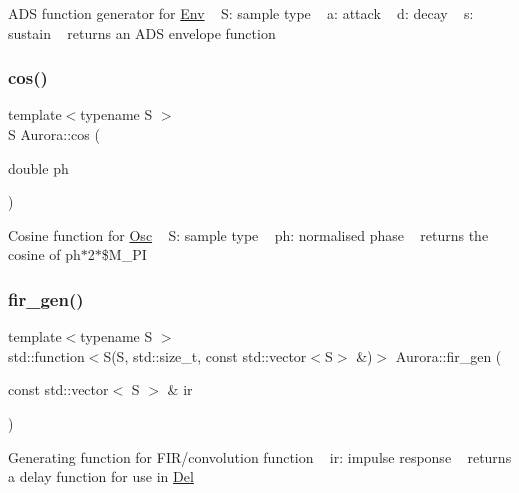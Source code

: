 A\+DS function generator for \hyperlink{class_aurora_1_1_env}{Env} ~\newline
S\+: sample type ~\newline
a\+: attack ~\newline
d\+: decay ~\newline
s\+: sustain ~\newline
returns an A\+DS envelope function \mbox{\label{namespace_aurora_ab6ef1b966b8f27d107fcabe1027a677a}} 
\subsubsection{\texorpdfstring{cos()}{cos()}}
{\footnotesize\ttfamily template$<$typename S $>$ \\
S Aurora\+::cos (\begin{DoxyParamCaption}\item[{double}]{ph }\end{DoxyParamCaption})}

Cosine function for \hyperlink{class_aurora_1_1_osc}{Osc} ~\newline
S\+: sample type ~\newline
ph\+: normalised phase ~\newline
returns the cosine of ph$\ast$2$\ast$\$\+M\+\_\+\+PI \mbox{\label{namespace_aurora_abf3b452f54db43f366b261c3702b0c0b}} 
\subsubsection{\texorpdfstring{fir\+\_\+gen()}{fir\_gen()}}
{\footnotesize\ttfamily template$<$typename S $>$ \\
std\+::function$<$S(S, std\+::size\+\_\+t, const std\+::vector$<$S$>$ \&)$>$ Aurora\+::fir\+\_\+gen (\begin{DoxyParamCaption}\item[{const std\+::vector$<$ S $>$ \&}]{ir }\end{DoxyParamCaption})}

Generating function for F\+I\+R/convolution function ~\newline
ir\+: impulse response ~\newline
returns a delay function for use in \hyperlink{class_aurora_1_1_del}{Del} \mbox{\label{namespace_aurora_a62442f237e70fdaac1efc22b4e82e875}} 
